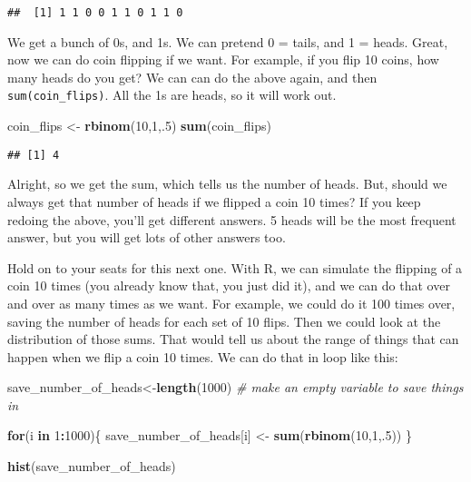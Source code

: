 \documentclass[
]{book}
\newenvironment{Shaded}{\begin{snugshade}}{\end{snugshade}}
\newcommand{\CommentTok}[1]{\textcolor[rgb]{0.56,0.35,0.01}{\textit{#1}}}
\newcommand{\ControlFlowTok}[1]{\textcolor[rgb]{0.13,0.29,0.53}{\textbf{#1}}}
\newcommand{\DecValTok}[1]{\textcolor[rgb]{0.00,0.00,0.81}{#1}}
\newcommand{\FunctionTok}[1]{\textcolor[rgb]{0.13,0.29,0.53}{\textbf{#1}}}
\newcommand{\NormalTok}[1]{#1}
\newcommand{\OtherTok}[1]{\textcolor[rgb]{0.56,0.35,0.01}{#1}}
\newcommand{\SpecialCharTok}[1]{\textcolor[rgb]{0.81,0.36,0.00}{\textbf{#1}}}
\begin{document}
\begin{verbatim}
##  [1] 1 1 0 0 1 1 0 1 1 0
\end{verbatim}

We get a bunch of 0s, and 1s. We can pretend 0 = tails, and 1 = heads.
Great, now we can do coin flipping if we want. For example, if you flip
10 coins, how many heads do you get? We can can do the above again, and
then \texttt{sum(coin\_flips)}. All the 1s are heads, so it will work out.

\begin{Shaded}
\begin{Highlighting}[]
\NormalTok{coin\_flips }\OtherTok{\textless{}{-}} \FunctionTok{rbinom}\NormalTok{(}\DecValTok{10}\NormalTok{,}\DecValTok{1}\NormalTok{,.}\DecValTok{5}\NormalTok{)}
\FunctionTok{sum}\NormalTok{(coin\_flips)}
\end{Highlighting}
\end{Shaded}

\begin{verbatim}
## [1] 4
\end{verbatim}

Alright, so we get the sum, which tells us the number of heads. But,
should we always get that number of heads if we flipped a coin 10 times?
If you keep redoing the above, you'll get different answers. 5 heads
will be the most frequent answer, but you will get lots of other answers
too.

Hold on to your seats for this next one. With R, we can simulate the
flipping of a coin 10 times (you already know that, you just did it),
and we can do that over and over as many times as we want. For example,
we could do it 100 times over, saving the number of heads for each set
of 10 flips. Then we could look at the distribution of those sums. That
would tell us about the range of things that can happen when we flip a
coin 10 times. We can do that in loop like this:

\begin{Shaded}
\begin{Highlighting}[]
\NormalTok{save\_number\_of\_heads}\OtherTok{\textless{}{-}}\FunctionTok{length}\NormalTok{(}\DecValTok{1000}\NormalTok{) }\CommentTok{\# make an empty variable to save things in}

\ControlFlowTok{for}\NormalTok{(i }\ControlFlowTok{in} \DecValTok{1}\SpecialCharTok{:}\DecValTok{1000}\NormalTok{)\{}
\NormalTok{  save\_number\_of\_heads[i] }\OtherTok{\textless{}{-}} \FunctionTok{sum}\NormalTok{(}\FunctionTok{rbinom}\NormalTok{(}\DecValTok{10}\NormalTok{,}\DecValTok{1}\NormalTok{,.}\DecValTok{5}\NormalTok{))}
\NormalTok{\}}

\FunctionTok{hist}\NormalTok{(save\_number\_of\_heads)}
\end{Highlighting}
\end{Shaded}
\end{document}
